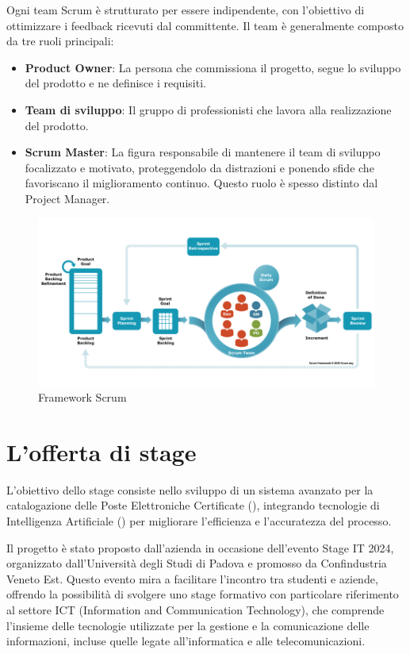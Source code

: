 Ogni team Scrum è strutturato per essere indipendente, con l'obiettivo di ottimizzare i feedback ricevuti dal committente. Il team è generalmente composto da tre ruoli principali:

\begin{itemize}
    \item \textbf{Product Owner}: La persona che commissiona il progetto, segue lo sviluppo del prodotto e ne definisce i requisiti.
    \item \textbf{Team di sviluppo}: Il gruppo di professionisti che lavora alla realizzazione del prodotto.
    \item \textbf{Scrum Master}: La figura responsabile di mantenere il team di sviluppo focalizzato e motivato, proteggendolo da distrazioni e ponendo sfide che favoriscano il miglioramento continuo. Questo ruolo è spesso distinto dal Project Manager.
\end{itemize}

\begin{figure}[h!]
    \centering
    \includegraphics[width=0.9\columnwidth]{img/scrum.png}
    \caption{Framework Scrum}
    \label{fig:scrum}
\end{figure}

\section{L'offerta di stage}
L'obiettivo dello stage consiste nello sviluppo di un sistema avanzato per la catalogazione delle Poste Elettroniche Certificate (), integrando tecnologie di Intelligenza Artificiale () per migliorare l'efficienza e l'accuratezza del processo.

Il progetto è stato proposto dall'azienda in occasione dell'evento Stage IT 2024, organizzato dall'Università degli Studi di Padova e promosso da Confindustria Veneto Est. Questo evento mira a facilitare l'incontro tra studenti e aziende, offrendo la possibilità di svolgere uno stage formativo con particolare riferimento al settore ICT (Information and Communication Technology), che comprende l'insieme delle tecnologie utilizzate per la gestione e la comunicazione delle informazioni, incluse quelle legate all'informatica e alle telecomunicazioni.

